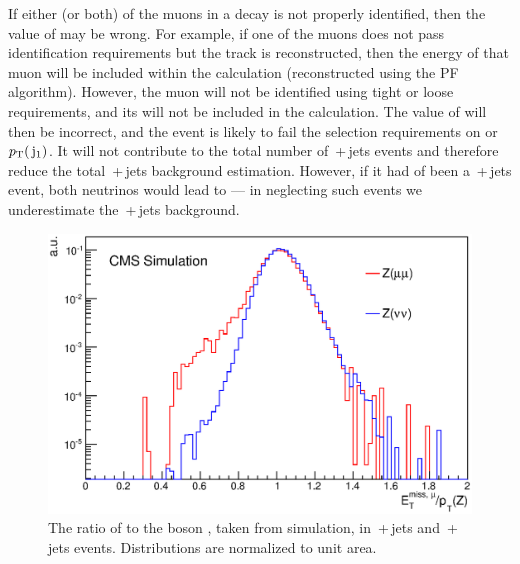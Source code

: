 If either (or both) of the muons in a \zmumu decay is not properly identified, 
then the value of \METmu may be wrong.
For example, if one of the muons does not pass identification requirements but the track is reconstructed, 
then the energy of that muon will be included within the \METv calculation (reconstructed using the \ac{PF} algorithm).
However, the muon will not be identified using tight or loose requirements, and its \ptv will not be included in the \METvmu calculation.
The value of \METvmu will then be incorrect, 
and the event is likely to fail the selection requirements on \METmu or $p_{\text{T}}(\,\mathrm{j}_1)$.
%
It will not contribute to the total number of \zmumubr{}\,+\,jets events and therefore reduce the total \znunubr{}\,+\,jets background estimation.
However, if it had of been a \znunubr{}\,+\,jets event, 
both neutrinos would lead to \MET --- in neglecting such events we underestimate the \znunubr{}\,+\,jets background.


\begin{figure}%
  \begin{center}
  \includegraphics[scale=0.55]     {Figures/sus13009/ratioMETnoMu_GenZpT.eps}
   \caption{The ratio of \METmu to the \Z{} boson \pt, taken from simulation, in \zmumubr{}\,+\,jets and \znunubr{}\,+\,jets events. Distributions are normalized to unit area.
         \label{fig:metratio}}
  \end{center}
\end{figure}

